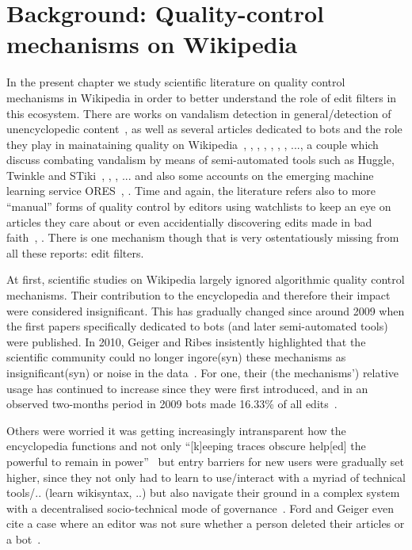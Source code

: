 \chapter{Background: Quality-control mechanisms on Wikipedia}
\label{chap:background}

\begin{comment}
- algorithmic governance
- code is law
\end{comment}

In the present chapter we study scientific literature on quality control mechanisms in Wikipedia in order to better understand the role of edit filters in this ecosystem.
There are works on vandalism detection in general/detection of unencyclopedic content~\cite{PotSteGer2008}, %
as well as several articles dedicated to bots and the role they play in mainataining quality on Wikipedia~\cite{GeiHal2013}, \cite{Geiger2014}, \cite{GeiHal2017}, \cite{GeiRib2010}, \cite{HalRied2012}, \cite{Livingstone2016}, \cite{MueDoHer2013}, \cite{MuellerBirn2014}...,
a couple which discuss combating vandalism by means of semi-automated tools such as Huggle, Twinkle and STiki~\cite{GeiRib2010}, \cite{HalRied2012}, \cite{WestKanLee2010}, \cite{GeiHal2013} ...
and also some accounts on the emerging machine learning service ORES~\cite{HalTar2015}, \cite{HalGeiMorSarWig2018}.
Time and again, the literature refers also to more ``manual'' forms of quality control by editors using watchlists to keep an eye on articles they care about or even accidentially discovering edits made in bad faith~\cite{Livingstone2016}, \cite{AstHal2018}.
There is one mechanism though that is very ostentatiously missing from all these reports: edit filters.

At first, scientific studies on Wikipedia largely ignored algorithmic quality control mechanisms.
Their contribution to the encyclopedia and therefore their impact were considered insignificant. %
This has gradually changed since around 2009 when the first papers specifically dedicated to bots (and later semi-automated tools) were published.
In 2010, Geiger and Ribes insistently highlighted that the scientific community could no longer ingore(syn) these mechanisms as insignificant(syn) or noise in the data~\cite{GeiRib2010}.
For one, their (the mechanisms') relative usage has continued to increase since they were first introduced, and in an observed two-months period in 2009 bots made 16.33\% of all edits~\cite{Geiger2009}.

Others were worried it was getting increasingly intransparent how the encyclopedia functions and not only ``[k]eeping traces obscure help[ed] the powerful to remain in power''~\cite{ForGei2012} but entry barriers for new users were gradually set higher, since they not only had to learn to use/interact with a myriad of technical tools/.. (learn wikisyntax, ..) but also navigate their ground in a complex system with a decentralised socio-technical mode of governance~\cite{Geiger2017}.
Ford and Geiger even cite a case where an editor was not sure whether a person deleted their articles or a bot~\cite{ForGei2012}.

